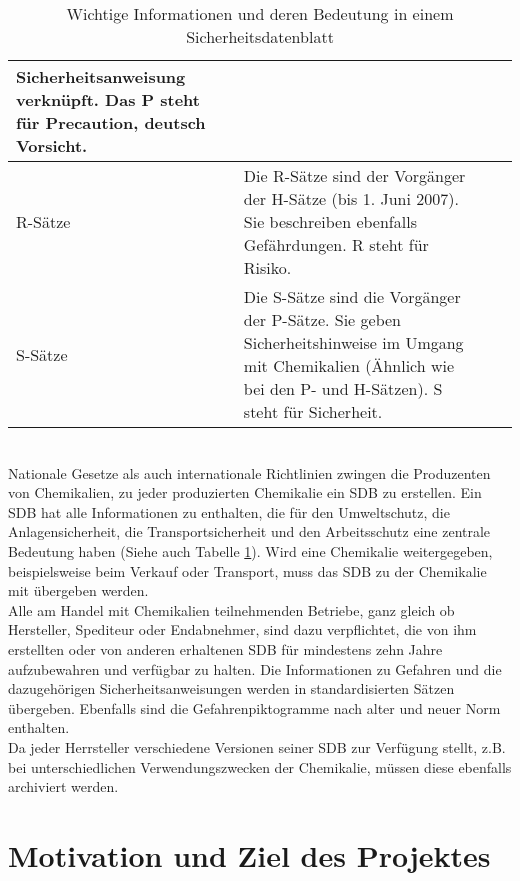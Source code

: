 \begin{table}
\begin{tabular}{|p{}|p{}|l|l|}
     Sicherheitsanweisung verknüpft. Das P steht für Precaution, deutsch Vorsicht.
     \\
     \hline 
     R-Sätze & Die R-Sätze sind der Vorgänger der H-Sätze (bis 1. Juni
     2007). Sie beschreiben ebenfalls Gefährdungen. R steht für Risiko.
     \\
     \hline 
     S-Sätze & Die S-Sätze sind die Vorgänger der P-Sätze. Sie geben
     Sicherheitshinweise im Umgang mit Chemikalien (Ähnlich wie bei den P- und
     H-Sätzen). S steht für Sicherheit.
     \\
     \hline
  \end{tabular}
 \label{tab:meinetabelle}
 \caption[Bedeutung der Informationen eines Sicherheitsdatenblatts]{Wichtige
 Informationen und deren Bedeutung in einem Sicherheitsdatenblatt}
\end{table} 
\\
Nationale Gesetze als auch internationale Richtlinien zwingen die Produzenten
von Chemikalien, zu jeder produzierten Chemikalie ein
\ac{SDB} zu erstellen. Ein \ac{SDB} hat alle Informationen zu enthalten, die für
den Umweltschutz, die Anlagensicherheit, die Transportsicherheit und den
Arbeitsschutz eine zentrale Bedeutung haben \cite{VCI-2008} (Siehe auch Tabelle
\ref{tab:meinetabelle}). Wird eine Chemikalie weitergegeben, beispielsweise beim
Verkauf oder Transport, muss das \ac{SDB} zu der Chemikalie mit übergeben
werden.
\\
Alle am Handel mit Chemikalien teilnehmenden Betriebe, ganz gleich ob
Hersteller, Spediteur oder Endabnehmer, sind dazu verpflichtet, die von ihm
erstellten oder von anderen erhaltenen \ac{SDB} für mindestens zehn Jahre
aufzubewahren und verfügbar zu halten. Die Informationen zu Gefahren und die
dazugehörigen Sicherheitsanweisungen werden in standardisierten Sätzen
übergeben. Ebenfalls sind die Gefahrenpiktogramme nach alter und neuer Norm
enthalten.
\\
Da jeder Herrsteller verschiedene Versionen seiner \ac{SDB} zur Verfügung
stellt, z.B. bei unterschiedlichen Verwendungszwecken der Chemikalie, müssen
diese ebenfalls archiviert werden.

\section{Motivation und Ziel des Projektes}
\label{projektziel_motivation}

